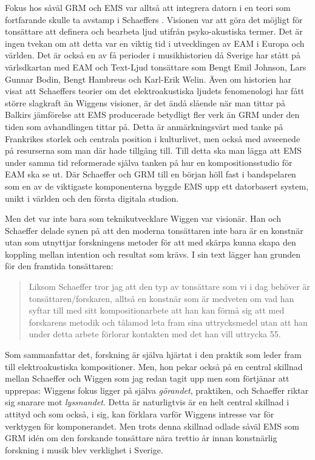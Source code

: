 \documentclass[11pt]{article}
\begin{document}
Fokus hos såväl GRM och EMS var alltså att integrera datorn i en teori som fortfarande skulle ta avstamp i Schaeffers . Visionen var att göra det möjligt för tonsättare att definera och bearbeta ljud utifrån psyko-akustiska termer. Det är ingen tvekan om att detta var en viktig tid i utvecklingen av EAM i Europa och världen. Det är också en av få perioder i musikhistorien då Sverige har stått på värlsdkartan med EAM och Text-Ljud tonsättare som Bengt Emil Johnson, Lars Gunnar Bodin, Bengt Hambreus och Karl-Erik Welin. Även om historien har visat att Schaeffers teorier om det elektroakustiska ljudets fenomenologi har fått större slagkraft än Wiggens visioner, är det ändå slående när man tittar på Balkirs jämförelse att EMS producerade betydligt fler verk än GRM under den tiden som avhandlingen tittar på. Detta är anmärkningsvärt med tanke på Frankrikes storlek och centrala position i kulturlivet, men också med avseenede på resurserna som man där hade tillgång till. Till detta ska man lägga att EMS under samma tid reformerade själva tanken på hur en kompositionsstudio för EAM ska se ut. Där Schaeffer och GRM till en början höll fast i bandspelaren som en av de viktigaste komponenterna byggde EMS upp ett datorbasert system, unikt i världen och den första digitala studion.

Men det var inte bara som teknikutvecklare Wiggen var visionär. Han och Schaeffer delade synen på att den moderna tonsättaren inte bara är en konstnär utan som utnyttjar forskningens metoder för att med skärpa kunna skapa den koppling mellan intention och resultat som krävs. I sin text  lägger han grunden för den framtida tonsättaren:

\begin{quote}
Liksom Schaeffer tror jag att den typ av tonsättare som vi i dag
behöver är tonsättaren/forskaren, alltså en konstnär som är medveten
om vad han syftar till med sitt kompositionarbete att han kan förmå
sig att med forskarens metodik och tålamod leta fram sina
uttrycksmedel utan att han under detta arbete förlorar kontakten med
det han vill uttrycka 55. \citep[s. 124, citerad i Balkir (2018), s. 54]{wiggen1972}
\end{quote}

Som \citet[s. 53]{Balkir2018} sammanfattar det, forskning är själva hjärtat i den praktik som leder fram till elektroakustiska kompositioner. Men, hon pekar också på en central skillnad mellan Schaeffer och Wiggen som jag redan tagit upp men som förtjänar att upprepas: Wiggens fokus ligger på själva \emph{görandet}, praktiken, och Schaeffer riktar sig snarare mot \emph{lyssnandet}. Detta är naturligtvis är en helt central skillnad i attityd och som också, i sig, kan förklara varför Wiggens intresse var för verktygen för komponerandet. Men trots denna skillnad odlade såväl EMS som GRM idén om den forskande tonsättare nära trettio år innan konstnärlig forskning i musik blev verklighet i Sverige.
\end{document}

